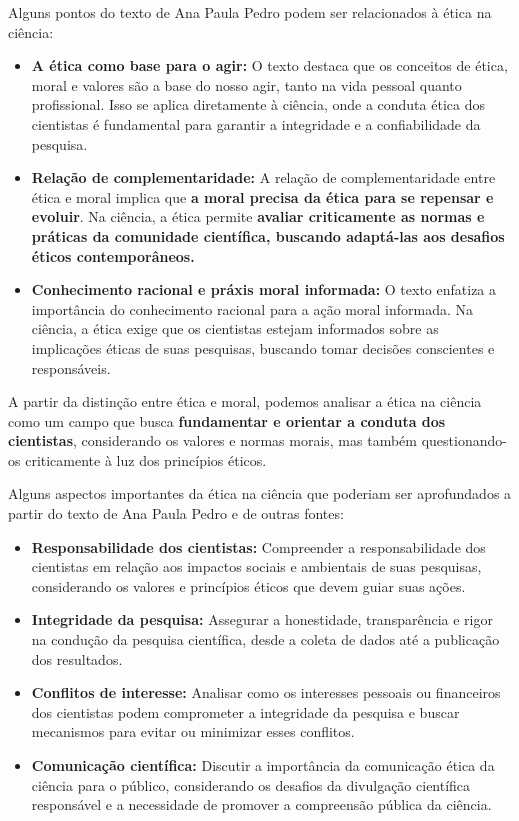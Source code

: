 \documentclass{article} %
\begin{document}
Alguns pontos do texto de Ana Paula Pedro podem ser relacionados à ética na ciência:
\begin{itemize}
    \item \textbf{A ética como base para o agir:} O texto destaca que os conceitos de ética, moral e valores são a base do nosso agir, tanto na vida pessoal quanto profissional. Isso se aplica diretamente à ciência, onde a conduta ética dos cientistas é fundamental para garantir a integridade e a confiabilidade da pesquisa.
    \item \textbf{Relação de complementaridade:} A  relação de complementaridade entre ética e moral  implica que \textbf{a moral precisa da ética para se repensar e evoluir}.  Na ciência, a ética  permite  \textbf{avaliar criticamente as normas e práticas da comunidade científica, buscando  adaptá-las aos desafios éticos contemporâneos.}
    \item \textbf{Conhecimento racional e práxis moral informada:} O texto enfatiza a importância do conhecimento racional para a ação moral informada. Na ciência, a ética exige que os cientistas estejam informados sobre as implicações éticas de suas pesquisas, buscando tomar decisões conscientes e responsáveis.
\end{itemize}

A partir da distinção entre ética e moral, podemos analisar a ética na ciência como um campo que busca \textbf{fundamentar e orientar a conduta dos cientistas}, considerando os valores e normas morais, mas também questionando-os criticamente à luz dos princípios éticos.

Alguns aspectos importantes da ética na ciência que poderiam ser aprofundados a partir do texto de Ana Paula Pedro e de outras fontes:
\begin{itemize}
    \item \textbf{Responsabilidade dos cientistas:}  Compreender a responsabilidade dos cientistas em relação aos impactos sociais e ambientais de suas pesquisas, considerando os valores e princípios éticos que devem guiar suas ações.
    \item \textbf{Integridade da pesquisa:} Assegurar a honestidade, transparência e rigor na condução da pesquisa científica, desde a coleta de dados até a publicação dos resultados.
    \item \textbf{Conflitos de interesse:} Analisar como os interesses pessoais ou financeiros dos cientistas podem comprometer a integridade da pesquisa e buscar mecanismos para evitar ou minimizar esses conflitos.
    \item \textbf{Comunicação científica:}  Discutir a importância da comunicação ética da ciência para o público, considerando os desafios da divulgação científica responsável e a necessidade de promover a  compreensão pública da ciência.
\end{itemize}
\end{document}
